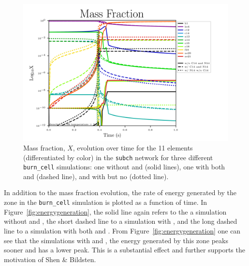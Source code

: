 \documentclass[preprint]{aastex62}
\begin{document}
      \begin{figure}
        \centering
        \includegraphics[width=5in]{images/subch_nC14nN14_xn_tol-10.png}
        \caption{Mass fraction, $X$, evolution over time for the 11 elements (differentiated by color) in the {\tt subch} network for three different {\tt burn\_cell} simulations: one without  and  (solid lines), one with both  and  (dashed line), and with  but no  (dotted line). %
          }
        \label{fig:microphysicsX}
      \end{figure} 
      
      In addition to the mass fraction evolution, the rate of energy generated by the zone in the {\tt burn\_cell} simulation is plotted as a function of time. In Figure~\ref{fig:energygeneration}, the solid line again refers to the a simulation without  and , the short dashed line to a simulation with , and the long dashed line to a simulation with both  and . From Figure~\ref{fig:energygeneration} one can see that the simulations with  and , the energy generated by this zone peaks sooner and has a lower peak. This is a substantial effect and further supports the motivation of Shen \& Bildsten. %
      
\end{document}
